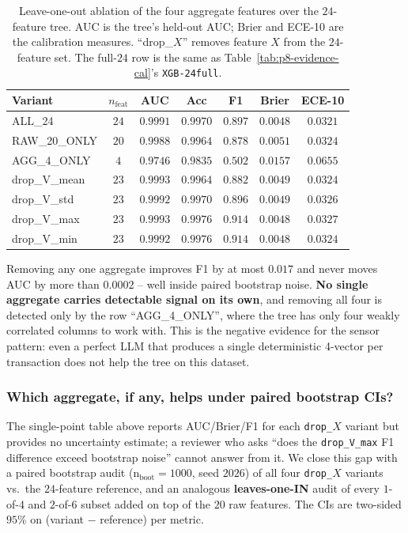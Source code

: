 \documentclass{article}
\providecommand{\tableref}[1]{Table~\ref{#1}}
\begin{document}
\begin{table}[t]
\centering
\small
\caption{Leave-one-out ablation of the four aggregate features over
the $24$-feature tree. AUC is the tree's held-out AUC; Brier and ECE-10
are the calibration measures. ``drop\_$X$'' removes feature $X$ from
the $24$-feature set. The full-$24$ row is the same as
\tableref{tab:p8-evidence-cal}'s \texttt{XGB-24full}.}
\label{tab:p8-evidence-abl}
\begin{tabular}{lcccccc}
\toprule
Variant & $n_{\text{feat}}$ & AUC & Acc & F1 & Brier & ECE-10 \\
\midrule
ALL\_24         & $24$ & $0.9991$ & $0.9970$ & $0.897$ & $0.0048$ & $0.0321$ \\
RAW\_20\_ONLY   & $20$ & $0.9988$ & $0.9964$ & $0.878$ & $0.0051$ & $0.0324$ \\
AGG\_4\_ONLY    & $4$  & $0.9746$ & $0.9835$ & $0.502$ & $0.0157$ & $0.0655$ \\
drop\_V\_mean   & $23$ & $0.9993$ & $0.9964$ & $0.882$ & $0.0049$ & $0.0324$ \\
drop\_V\_std    & $23$ & $0.9992$ & $0.9970$ & $0.896$ & $0.0049$ & $0.0326$ \\
drop\_V\_max    & $23$ & $0.9993$ & $0.9976$ & $0.914$ & $0.0048$ & $0.0327$ \\
drop\_V\_min    & $23$ & $0.9992$ & $0.9976$ & $0.914$ & $0.0048$ & $0.0324$ \\
\bottomrule
\end{tabular}
\end{table}

Removing any one aggregate improves F1 by at most $0.017$ and never
moves AUC by more than $0.0002$ -- well inside paired bootstrap noise.
\textbf{No single aggregate carries detectable signal on its own}, and
removing all four is detected only by the row ``AGG\_4\_ONLY'', where
the tree has only four weakly correlated columns to work with. This is
the negative evidence for the sensor pattern: even a perfect LLM that
produces a single deterministic 4-vector per transaction does not help
the tree on this dataset.

\subsubsection{Which aggregate, if any, helps under paired bootstrap CIs?}

The single-point table above reports AUC/Brier/F1 for each
\texttt{drop\_$X$} variant but provides no uncertainty estimate; a
reviewer who asks ``does the \texttt{drop\_V\_max} F1 difference
exceed bootstrap noise'' cannot answer from it. We close this gap with
a paired bootstrap audit (n$_{\text{boot}}{=}1000$, seed $2026$) of
all four \texttt{drop\_$X$} variants vs.\ the $24$-feature reference,
and an analogous \textbf{leaves-one-IN} audit of every $1$-of-$4$ and
$2$-of-$6$ subset added on top of the $20$ raw features. The CIs are
two-sided $95$\% on (variant $-$ reference) per metric.
\end{document}
